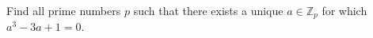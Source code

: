 Find all prime numbers \(p\) such that there exists a unique \(a \in \mathbb{Z}_p\) for which \(a^3 - 3a + 1 = 0.\)
